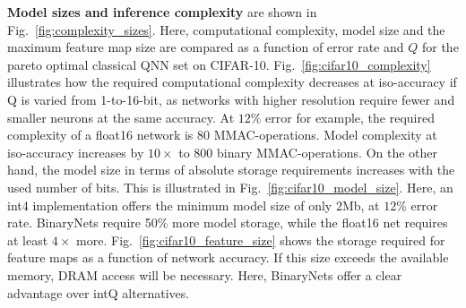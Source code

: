 \documentclass[article,10pt]{IEEEtran}
\begin{document}
\textbf{Model sizes and inference complexity} are shown in Fig.~\ref{fig:complexity_sizes}. Here, computational complexity, model size and the maximum feature map size are compared as a function of error rate and $Q$ for the pareto optimal classical QNN set on CIFAR-10. Fig.~\ref{fig:cifar10_complexity} illustrates how the required computational complexity decreases at iso-accuracy if Q is varied from 1-to-16-bit, as networks with higher resolution require fewer and smaller neurons at the same accuracy. 
At $12\%$ error for example, the required complexity of a float16 network is $80$ MMAC-operations. Model complexity at iso-accuracy increases by $10\times$ to $800$ binary MMAC-operations. On the other hand, the model size in terms of absolute storage requirements increases with the used number of bits. This is illustrated in Fig.~\ref{fig:cifar10_model_size}. Here, an int4 implementation offers the minimum model size of only $2$Mb, at $12\%$ error rate. BinaryNets require 50\% more model storage, while the float16 net requires at least $4\times$ more. Fig.~\ref{fig:cifar10_feature_size} shows the storage required for feature maps as a function of network accuracy. If this size exceeds the available memory, DRAM access will be necessary. Here, BinaryNets offer a clear advantage over intQ alternatives. 
\end{document}
